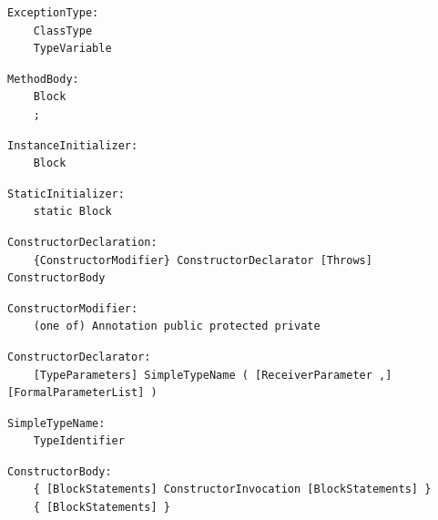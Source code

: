 \noindent\textbf{\texttt{}}\par
\begin{lstlisting}
ExceptionType:
    ClassType
    TypeVariable
\end{lstlisting}

\noindent\textbf{\texttt{}}\par
\begin{lstlisting}
MethodBody:
    Block
    ;
\end{lstlisting}

\noindent\textbf{\texttt{}}\par
\begin{lstlisting}
InstanceInitializer:
    Block
\end{lstlisting}

\noindent\textbf{\texttt{}}\par
\begin{lstlisting}
StaticInitializer:
    static Block
\end{lstlisting}

\noindent\textbf{\texttt{}}\par
\begin{lstlisting}
ConstructorDeclaration:
    {ConstructorModifier} ConstructorDeclarator [Throws] ConstructorBody
\end{lstlisting}

\noindent\textbf{\texttt{}}\par
\begin{lstlisting}
ConstructorModifier:
    (one of) Annotation public protected private
\end{lstlisting}

\noindent\textbf{\texttt{}}\par
\begin{lstlisting}
ConstructorDeclarator:
    [TypeParameters] SimpleTypeName ( [ReceiverParameter ,] [FormalParameterList] )
\end{lstlisting}

\noindent\textbf{\texttt{}}\par
\begin{lstlisting}
SimpleTypeName:
    TypeIdentifier
\end{lstlisting}

\noindent\textbf{\texttt{}}\par
\begin{lstlisting}
ConstructorBody:
    { [BlockStatements] ConstructorInvocation [BlockStatements] }
    { [BlockStatements] }
\end{lstlisting}

